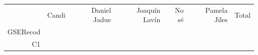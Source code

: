 \documentclass[
]{article}
\begin{document}
\begin{longtable}[]{@{}rrrrrrr@{}}
\toprule
\endhead
\begin{minipage}[t]{0.08\columnwidth}\raggedleft
\strut
\end{minipage} & \begin{minipage}[t]{0.06\columnwidth}\raggedleft
Candi\strut
\end{minipage} & \begin{minipage}[t]{0.13\columnwidth}\raggedleft
Daniel Jadue\strut
\end{minipage} & \begin{minipage}[t]{0.13\columnwidth}\raggedleft
Joaquín Lavín\strut
\end{minipage} & \begin{minipage}[t]{0.13\columnwidth}\raggedleft
No sé\strut
\end{minipage} & \begin{minipage}[t]{0.13\columnwidth}\raggedleft
Pamela Jiles\strut
\end{minipage} & \begin{minipage}[t]{0.13\columnwidth}\raggedleft
Total\strut
\end{minipage}\tabularnewline
\begin{minipage}[t]{0.08\columnwidth}\raggedleft
GSERecod\strut
\end{minipage} & \begin{minipage}[t]{0.06\columnwidth}\raggedleft
\strut
\end{minipage} & \begin{minipage}[t]{0.13\columnwidth}\raggedleft
\strut
\end{minipage} & \begin{minipage}[t]{0.13\columnwidth}\raggedleft
\strut
\end{minipage} & \begin{minipage}[t]{0.13\columnwidth}\raggedleft
\strut
\end{minipage} & \begin{minipage}[t]{0.13\columnwidth}\raggedleft
\strut
\end{minipage} & \begin{minipage}[t]{0.13\columnwidth}\raggedleft
\strut
\end{minipage}\tabularnewline
\begin{minipage}[t]{0.08\columnwidth}\raggedleft
C1\strut
\end{minipage} & \begin{minipage}[t]{0.06\columnwidth}\raggedleft
\strut
\end{minipage} & \begin{minipage}[t]{0.13\columnwidth}\raggedleft

\end{minipage}
\end{longtable}
\end{document}
